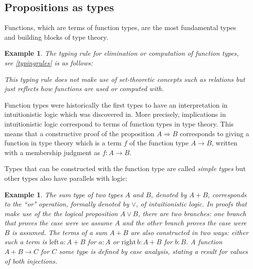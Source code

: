 \documentclass[12pt,a4paper,twoside,xetex,draft]{book}
\newcommand{\keyword}[1]{\emph{#1}\index{#1}}
\newtheorem{example}[theorem]{Example}
\begin{document}
\subsection{Propositions as types}\label{curryhoward}

Functions, which are terms of function types, are the most fundamental types and building blocks of type theory. 

\begin{example}
The typing rule for elimination or computation of function types, see \cref{typingrules} is as follows:
\begin{prooftree}
    \end{prooftree}
This typing rule does not make use of set-theoretic concepts such as relations but just reflects how functions are used or computed with.
\end{example}
    
    
Function types were historically the first types to have an interpretation in intuitionistic logic \cite{Heyting1930} which was discovered in\cite{Curry1934Nov}. More precisely, implications in intuitionistic logic correspond to terms of function types in type theory. This means that a constructive proof of the proposition $A \Rightarrow B$ corresponds to giving a function  in type theory which is a term $f$ of the function type $ A \rightarrow B$, written with a membership judgment as $f: A \rightarrow B$. 

Types that can be constructed with the function type are called \keyword{simple types} but other types also have parallels with logic:

\begin{example}
The \keyword{sum type} of two types $A$ and $B$, denoted by $A+B$, corresponds to the ``or" operation, formally denoted by $\vee$, of intuitionistic logic. In proofs that make use of the the logical proposition $A \vee B$, there are two branches: one branch that proves the case were we assume $A$ and the other branch proves the case were $B$ is assumed. The terms of a sum $A+B$ are also constructed in two ways: either such a term is $\text{left}\,a:A+B$ for $a:A$ or $\text{right}\,b:A+B$ for $b:B$. A function $A+B\rightarrow C$ for $C$ some type is defined by case analysis, stating a result for values of both injections.
\end{example}
\end{document}
